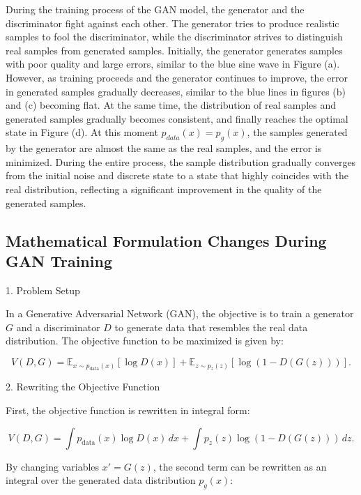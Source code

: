 During the training process of the GAN model, the generator and the discriminator fight against each other. 
The generator tries to produce realistic samples to fool the discriminator, while the discriminator strives 
to distinguish real samples from generated samples. Initially, the generator generates samples with poor 
quality and large errors, similar to the blue sine wave in Figure (a). However, as training proceeds and 
the generator continues to improve, the error in generated samples gradually decreases, similar to the 
blue lines in figures (b) and (c) becoming flat. At the same time, the distribution of real samples and 
generated samples gradually becomes consistent, and finally reaches the optimal state in Figure (d). At this moment $p_{data}(x) = p_g(x)$, 
the samples generated by the generator are almost the same as the real samples, and the error is minimized. 
During the entire process, the sample distribution gradually converges from the initial noise and discrete 
state to a state that highly coincides with the real distribution, reflecting a significant improvement in 
the quality of the generated samples.


\subsection{Mathematical Formulation Changes During GAN Training}


1. Problem Setup

In a Generative Adversarial Network (GAN), the objective is to train a generator \( G \) and a discriminator \( D \) 
to generate data that resembles the real data distribution. The objective function to be maximized is given by:

\begin{equation}
    V(D, G) = \mathbb{E}_{x \sim p_{\text{data}}(x)} [\log D(x)] + \mathbb{E}_{z \sim p_{z}(z)} [\log (1 - D(G(z)))].
\end{equation}

2. Rewriting the Objective Function

First, the objective function is rewritten in integral form:

\begin{equation}
    V(D, G) = \int p_{\text{data}}(x) \log D(x) \, dx + \int p_{z}(z) \log (1 - D(G(z))) \, dz.
\end{equation}

By changing variables \(x' = G(z)\), the second term can be rewritten as an integral over the generated data distribution \(p_g(x)\):

